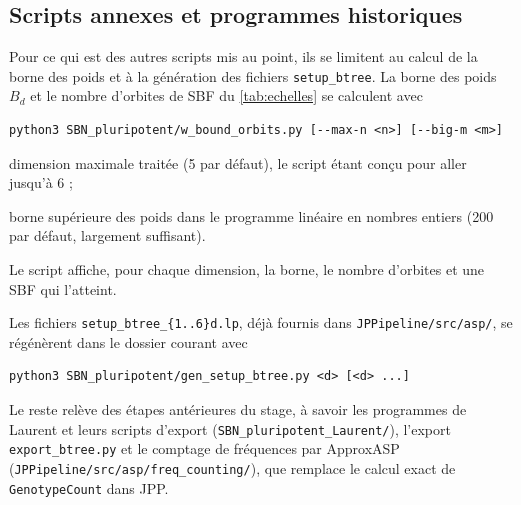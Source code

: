 \subsection{Scripts annexes et programmes historiques}
\label{ann:scripts}


Pour ce qui est des autres scripts mis au point, ils se limitent au calcul de la borne des poids et à la génération des fichiers \texttt{setup\_btree}.
La borne des poids $B_d$ et le nombre d'orbites de SBF du \cref{tab:echelles} se calculent avec
{\small
\begin{verbatim}
python3 SBN_pluripotent/w_bound_orbits.py [--max-n <n>] [--big-m <m>]
\end{verbatim}
}
\begin{description}
\setlength{\itemsep}{0pt}
\item[\texttt{-{}-max-n <n>}] dimension maximale traitée (5 par défaut), le script étant conçu pour aller jusqu'à 6 ;
\item[\texttt{-{}-big-m <m>}] borne supérieure des poids dans le programme linéaire en nombres entiers (200 par défaut, largement suffisant).
\end{description}
Le script affiche, pour chaque dimension, la borne, le nombre d'orbites et une SBF qui l'atteint.

Les fichiers \texttt{setup\_btree\_\{1..6\}d.lp}, déjà fournis dans \texttt{JPPipeline/src/asp/}, se régénèrent dans le dossier courant avec
{\small
\begin{verbatim}
python3 SBN_pluripotent/gen_setup_btree.py <d> [<d> ...]
\end{verbatim}
}

Le reste relève des étapes antérieures du stage, à savoir les programmes de Laurent et leurs scripts d'export (\texttt{SBN\_pluripotent\_Laurent/}), l'export \texttt{export\_btree.py} et le comptage de fréquences par ApproxASP (\texttt{JPPipeline/src/asp/freq\_counting/}), que remplace le calcul exact de \texttt{GenotypeCount} dans JPP.
